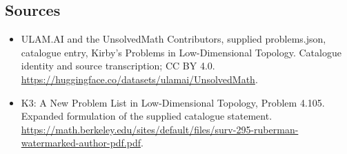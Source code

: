 \documentclass[11pt,a4paper]{article}
\begin{document}
\subsection{Sources}
\begin{itemize}
\item[S1] ULAM.AI and the UnsolvedMath Contributors, supplied problems.json, catalogue entry, Kirby's Problems in Low-Dimensional Topology. Catalogue identity and source transcription; CC BY 4.0.
\url{https://huggingface.co/datasets/ulamai/UnsolvedMath}.
\item[S2] K3: A New Problem List in Low-Dimensional Topology, Problem 4.105. Expanded formulation of the supplied catalogue statement.
\url{https://math.berkeley.edu/sites/default/files/surv-295-ruberman-watermarked-author-pdf.pdf}.
\end{itemize}
\end{document}
